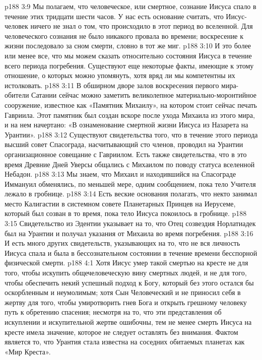 \vs p188 3:9 \bibnobreakspace Мы полагаем, что человеческое, или смертное, сознание Иисуса спало в течение этих тридцати шести часов. У нас есть основание считать, что Иисус\hyp{}человек ничего не знал о том, что происходило в этот период во вселенной. Для человеческого сознания не было никакого провала во времени; воскресение к жизни последовало за сном смерти, словно в тот же миг.
\vs p188 3:10 \pc И это более или менее все, что мы можем сказать относительно состояния Иисуса в течение всего периода погребения. Существуют еще некоторые факты, имеющие к этому отношение, о которых можно упомянуть, хотя вряд ли мы компетентны их истолковать.
\vs p188 3:11 В обширном дворе залов воскресения первого мира\hyp{}обители Сатании сейчас можно заметить великолепное материально\hyp{}моронтийное сооружение, известное как «Памятник Михаилу», на котором стоит сейчас печать Гавриила. Этот памятник был создан вскоре после ухода Михаила из этого мира, и на нем начертано: «В ознаменование смертной жизни Иисуса из Назарета на Урантии».
\vs p188 3:12 Существуют свидетельства того, что в течение этого периода высший совет Спасограда, насчитывающий сто членов, проводил на Урантии организационное совещание с Гавриилом. Есть также свидетельства, что в это время Древние Дней Уверсы общались с Михаилом по поводу статуса вселенной Небадон.
\vs p188 3:13 Мы знаем, что Михаил и находившийся на Спасограде Иммануил обменялись, по меньшей мере, одним сообщением, пока тело Учителя лежало в гробнице.
\vs p188 3:14 Есть веские основания полагать, что некто занимал место Калигастии в системном совете Планетарных Принцев на Иерусеме, который был созван в то время, пока тело Иисуса покоилось в гробнице.
\vs p188 3:15 Свидетельство из Эдентии указывает на то, что Отец созвездия Норлатиадек был на Урантии и получал указания от Михаила во время погребения.
\vs p188 3:16 И есть много других свидетельств, указывающих на то, что не вся личность Иисуса спала и была в бессознательном состоянии в течение времени бесспорной физической смерти.
\vs p188 4:1 Хотя Иисус умер такой смертью на кресте не для того, чтобы искупить общечеловеческую вину смертных людей, и не для того, чтобы обеспечить некий успешный подход к Богу, который без этого остался бы оскорбленным и неумолимым; хотя Сын Человеческий и не приносил себя в жертву для того, чтобы умиротворить гнев Бога и открыть грешному человеку путь к обретению спасения; несмотря на то, что эти представления об искуплении и искупительной жертве ошибочны, тем не менее смерть Иисуса на кресте имела значение, которое не следует оставлять без внимания. Фактом является то, что Урантия стала известна на соседних обитаемых планетах как «Мир Креста».
